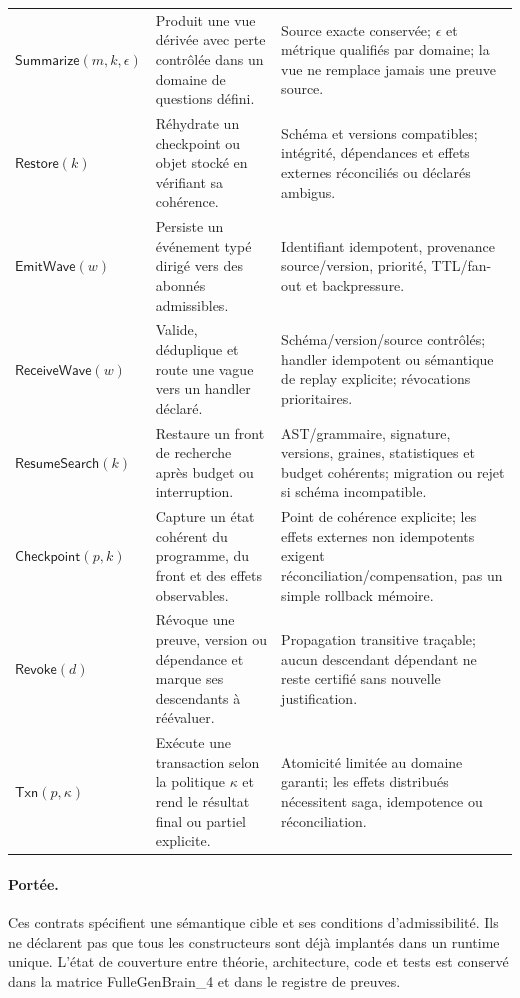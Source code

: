 \documentclass[11pt,a4paper]{article}
\theoremstyle{definition}
\theoremstyle{plain}
\theoremstyle{remark}
\begin{document}
\begin{longtable}{p{}p{}p{}}
\(\mathsf{Summarize}(m,k,\epsilon)\) & Produit une vue dérivée avec perte contrôlée dans un domaine de questions défini. & Source exacte conservée; \(\epsilon\) et métrique qualifiés par domaine; la vue ne remplace jamais une preuve source. \\
\(\mathsf{Restore}(k)\) & Réhydrate un checkpoint ou objet stocké en vérifiant sa cohérence. & Schéma et versions compatibles; intégrité, dépendances et effets externes réconciliés ou déclarés ambigus. \\
\(\mathsf{EmitWave}(w)\) & Persiste un événement typé dirigé vers des abonnés admissibles. & Identifiant idempotent, provenance source/version, priorité, TTL/fan-out et backpressure. \\
\(\mathsf{ReceiveWave}(w)\) & Valide, déduplique et route une vague vers un handler déclaré. & Schéma/version/source contrôlés; handler idempotent ou sémantique de replay explicite; révocations prioritaires. \\
\(\mathsf{ResumeSearch}(k)\) & Restaure un front de recherche après budget ou interruption. & AST/grammaire, signature, versions, graines, statistiques et budget cohérents; migration ou rejet si schéma incompatible. \\
\(\mathsf{Checkpoint}(p,k)\) & Capture un état cohérent du programme, du front et des effets observables. & Point de cohérence explicite; les effets externes non idempotents exigent réconciliation/compensation, pas un simple rollback mémoire. \\
\(\mathsf{Revoke}(d)\) & Révoque une preuve, version ou dépendance et marque ses descendants à réévaluer. & Propagation transitive traçable; aucun descendant dépendant ne reste certifié sans nouvelle justification. \\
\(\mathsf{Txn}(p,\kappa)\) & Exécute une transaction selon la politique \(\kappa\) et rend le résultat final ou partiel explicite. & Atomicité limitée au domaine garanti; les effets distribués nécessitent saga, idempotence ou réconciliation. \\
\bottomrule
\end{longtable}
\paragraph{Portée.} Ces contrats spécifient une sémantique cible et ses conditions d'admissibilité. Ils ne déclarent pas que tous les constructeurs sont déjà implantés dans un runtime unique. L'état de couverture entre théorie, architecture, code et tests est conservé dans la matrice FulleGenBrain\_4 et dans le registre de preuves.
\end{document}
